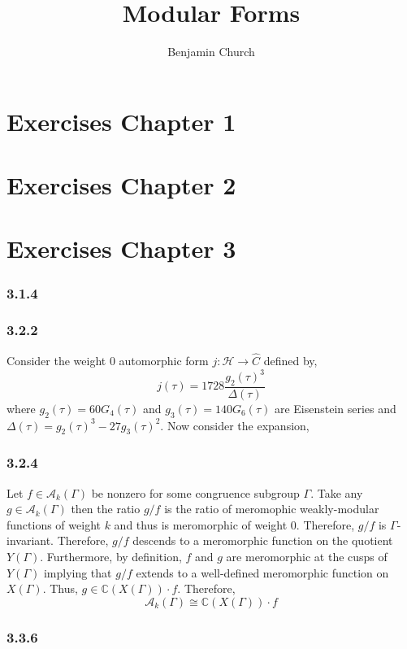 \documentclass{article}
\title{Modular Forms}
\author{Benjamin Church}
\newcommand{\C}{\mathbb{C}}
\theoremstyle{definition}
\newcommand{\A}[1]{\mathcal{A}_{#1}}
\newcommand{\half}{\mathcal{H}}
\begin{document}
\maketitle

\section{Exercises Chapter 1}


\section{Exercises Chapter 2}


\section{Exercises Chapter 3}

\subsubsection*{3.1.4}

\subsubsection*{3.2.2}
Consider the weight $0$ automorphic form $j : \half \to \hat{C}$ defined by,
\[ j(\tau) = 1728 \frac{g_2(\tau)^3}{\Delta(\tau)} \]
where $g_2(\tau) = 60 G_4(\tau)$ and $g_3(\tau) = 140 G_6(\tau)$ are Eisenstein series and $\Delta(\tau) = g_2(\tau)^3 - 27 g_3(\tau)^2$. Now consider the expansion,  

\subsubsection*{3.2.4}

Let $f \in \A{k}(\Gamma)$ be nonzero for some congruence subgroup $\Gamma$. Take any $g \in \A{k}(\Gamma)$ then the ratio $g / f$ is the ratio of meromophic weakly-modular functions of weight $k$ and thus is meromorphic of weight $0$. Therefore, $g / f$ is $\Gamma$-invariant. Therefore, $g / f$ descends to a meromorphic function on the quotient $Y(\Gamma)$. Furthermore, by definition, $f$ and $g$ are meromorphic at the cusps of $Y(\Gamma)$ implying that $g / f$ extends to a well-defined meromorphic function on $X(\Gamma)$. Thus, $g \in \C(X(\Gamma)) \cdot f$. Therefore,
\[ \A{k}(\Gamma) \cong \C(X(\Gamma)) \cdot f \]

\subsubsection*{3.3.6}
\end{document}
